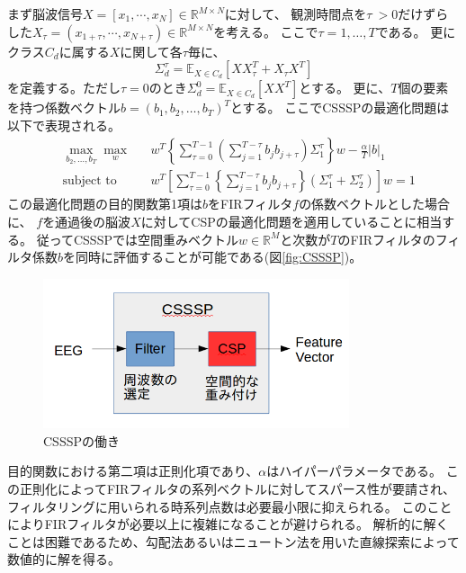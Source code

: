 まず脳波信号\(X = \left[ x_1, \cdots, x_N \right] \in \mathbb{R}^{M \times N}\)に対して、
観測時間点を\(\tau\ > 0\)だけずらした\(X_{\tau} = \left( x_{1+\tau}, \cdots, x_{N+\tau} \right) \in \mathbb{R}^{M \times N}\)を考える。
ここで$\tau = 1,\ldots,T$である。
更にクラス\( C_d \)に属する\( X \)に関して各\(\tau\)毎に、
\begin{equation}
    \Sigma_{d}^{\tau} = \mathbb E_{X \in C_d} \left[ XX_{\tau}^T + X_{\tau}X^T \right]
\end{equation}
を定義する。ただし\(\tau=0\)のとき\( \Sigma_{d}^{0} = \mathbb E_{X \in C_d} \left[XX^T \right] \)とする。
更に、\(T\)個の要素を持つ係数ベクトル$b=(b_1,b_2,\ldots,b_T)^T$とする。
ここでCSSSPの最適化問題は以下で表現される。
\begin{equation}
    \begin{aligned}
        & \max_{b_2,\ldots,b_T} \max_{w}
        & & w^T \left\{ \sum_{\tau = 0}^{T-1} \left( \sum_{j=1}^{T-\tau} b_j b_{j+\tau} \right) \Sigma_1^{\tau} \right\} w - \frac{\alpha}{T}|b|_1 \\
        & \text{subject to}
        & &  w^T \left[\sum_{\tau = 0}^{T-1} \left\{ \sum_{j=1}^{T-\tau}b_jb_{j+\tau} \right\} (\Sigma_1^{\tau} + \Sigma_2^{\tau}) \right] w = 1
    \end{aligned}
    \label{eq:csssp}
\end{equation}
この最適化問題の目的関数第1項は\(b\)をFIRフィルタ\(f\)の係数ベクトルとした場合に、
\(f\)を通過後の脳波\(X\)に対してCSPの最適化問題を適用していることに相当する。
従ってCSSSPでは空間重みベクトル\(w \in \mathbb R^M\)と次数が\(T\)のFIRフィルタのフィルタ係数\(b\)を同時に評価することが可能である(図\ref{fig:CSSSP})。
\begin{figure}
    \centering
    \includegraphics[width=9cm]{images/CSSSP.png}
    \caption{CSSSPの働き}
    \label{fig:FBCSP}
\end{figure}
目的関数における第二項は正則化項であり、$\alpha$はハイパーパラメータである。
この正則化によってFIRフィルタの系列ベクトルに対してスパース性が要請され、
フィルタリングに用いられる時系列点数は必要最小限に抑えられる。
このことによりFIRフィルタが必要以上に複雑になることが避けられる。
解析的に解くことは困難であるため、勾配法あるいはニュートン法を用いた直線探索によって数値的に解を得る。


